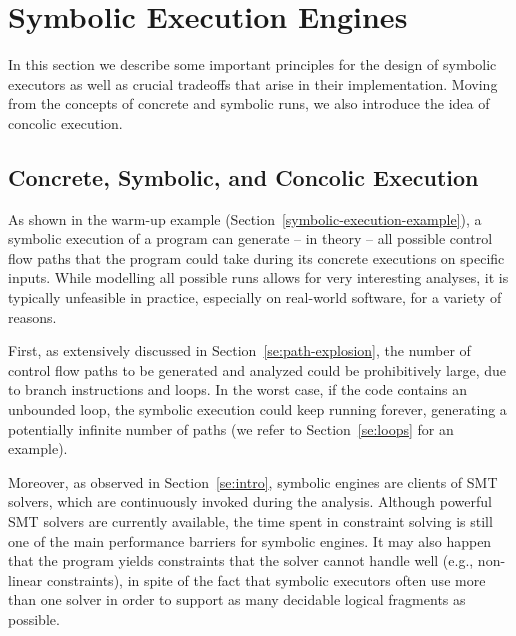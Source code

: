 
\section{Symbolic Execution Engines}
\label{se:executors}

In this section we describe some important principles for the design of symbolic executors as well as crucial tradeoffs that arise in their implementation. Moving from the concepts of concrete and symbolic runs, we also introduce the idea of concolic execution.

\subsection{Concrete, Symbolic, and Concolic Execution}
\label{ss:concrete-concolic-symbolic}

As shown in the warm-up example (Section~\ref{symbolic-execution-example}), a symbolic execution of a program can generate -- in theory -- all possible control flow paths that the program could take during its concrete executions on specific inputs. While modelling all possible runs allows for very interesting analyses, it is typically unfeasible in practice, especially on real-world software, for a variety of reasons.

First, as extensively discussed in Section~\ref{se:path-explosion}, the number of control flow paths to be generated and analyzed could be prohibitively large, due to branch instructions and loops. In the worst case, if the code contains an unbounded loop, the symbolic execution could keep running forever, generating a potentially infinite number of paths (we refer to Section~\ref{se:loops} for an example).

Moreover, as observed in Section~\ref{se:intro}, symbolic engines are clients of SMT solvers, which are continuously invoked during the analysis. Although powerful SMT solvers are currently available, the time spent in constraint solving is still one of the main performance barriers for symbolic engines. It may also happen that the program yields constraints that the solver cannot handle well (e.g., non-linear constraints), in spite of the fact that symbolic executors often use more than one solver in order to support as many decidable logical fragments as possible.

